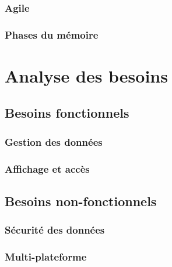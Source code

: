 \documentclass{EPL-master-thesis-covers-FR}
\begin{document}
			\subsection*{Agile}
			

				

			\subsection*{Phases du mémoire}

			

	\chapter{Analyse des besoins}
		\label{sec:analyse_besoins}


		\section{Besoins fonctionnels}

			

			\subsection*{Gestion des données}
				\label{sec:gest_donnee}



			\subsection*{Affichage et accès}

			

		\section{Besoins non-fonctionnels}


			\subsection*{Sécurité des données}


			\subsection*{Multi-plateforme}
				
\end{document}
